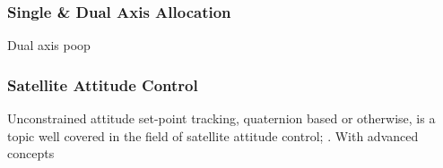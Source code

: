 \subsubsection*{Single \& Dual Axis Allocation}
Dual axis poop

\subsubsection*{Satellite Attitude Control}
Unconstrained attitude set-point tracking, quaternion based or otherwise, is a topic well covered in the field of satellite attitude control; \cite{}. With advanced concepts  
